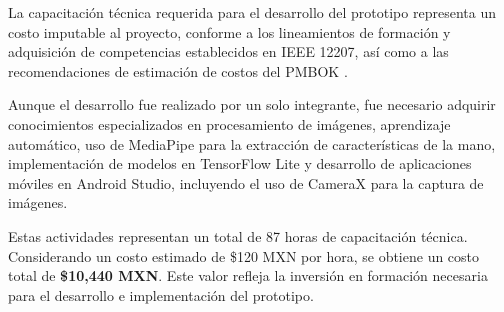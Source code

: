 	La capacitación técnica requerida para el desarrollo del prototipo representa un costo imputable al proyecto, conforme a los lineamientos de formación y adquisición de competencias establecidos en IEEE 12207, así como a las recomendaciones de estimación de costos del PMBOK \cite{ieee12207,pmbok2021}. 
	
	Aunque el desarrollo fue realizado por un solo integrante, fue necesario adquirir conocimientos especializados en procesamiento de imágenes, aprendizaje automático, uso de MediaPipe para la extracción de características de la mano, implementación de modelos en TensorFlow Lite y desarrollo de aplicaciones móviles en Android Studio, incluyendo el uso de CameraX para la captura de imágenes.
	
	Estas actividades representan un total de 87 horas de capacitación técnica. Considerando un costo estimado de \$120 MXN por hora, se obtiene un costo total de \textbf{\$10,440 MXN}. Este valor refleja la inversión en formación necesaria para el desarrollo e implementación del prototipo.
	
	\small
	\renewcommand{\arraystretch}{1.15}
	
